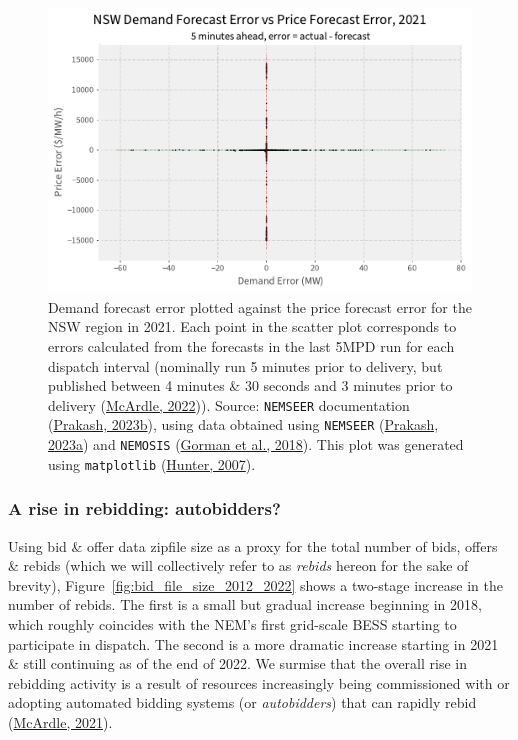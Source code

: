 \documentclass[12pt,a4paper,]{report}
\begin{document}
\begin{figure}
\hypertarget{fig:nsw_5min_price_demand_errors_2021}{%
\centering
\includegraphics{source/figures/NSW_demand_price_forecast_errors_300ahead_2021.pdf}
\caption{Demand forecast error plotted against the price forecast error
for the NSW region in 2021. Each point in the scatter plot corresponds
to errors calculated from the forecasts in the last 5MPD run for each
dispatch interval (nominally run 5 minutes prior to delivery, but
published between 4 minutes \& 30 seconds and 3 minutes prior to
delivery (\protect\hyperlink{ref-mcardleFileCreationTimes2022}{McArdle,
2022})). Source: \texttt{NEMSEER} documentation
(\protect\hyperlink{ref-prakashEnergyPriceConvergence2023}{Prakash,
2023b}), using data obtained using \texttt{NEMSEER}
(\protect\hyperlink{ref-prakashNEMSEER2023}{Prakash, 2023a}) and
\texttt{NEMOSIS}
(\protect\hyperlink{ref-gormanNEMOSISNEMOpen2018}{Gorman et al., 2018}).
This plot was generated using \texttt{matplotlib}
(\protect\hyperlink{ref-hunterMatplotlib2DGraphics2007}{Hunter,
2007}).}\label{fig:nsw_5min_price_demand_errors_2021}
}
\end{figure}

\hypertarget{sec:info-case_study-price_forecast_errors-bidding_analysis}{%
\subsubsection{A rise in rebidding:
autobidders?}\label{sec:info-case_study-price_forecast_errors-bidding_analysis}}

Using bid \& offer data zipfile size as a proxy for the total number of
bids, offers \& rebids (which we will collectively refer to as
\emph{rebids} hereon for the sake of brevity),
Figure~\ref{fig:bid_file_size_2012_2022} shows a two-stage increase in
the number of rebids. The first is a small but gradual increase
beginning in 2018, which roughly coincides with the NEM's first
grid-scale BESS starting to participate in dispatch. The second is a
more dramatic increase starting in 2021 \& still continuing as of the
end of 2022. We surmise that the overall rise in rebidding activity is a
result of resources increasingly being commissioned with or adopting
automated bidding systems (or \emph{autobidders}) that can rapidly rebid
(\protect\hyperlink{ref-mcardleRiseAutobidder2021}{McArdle, 2021}).
\end{document}

